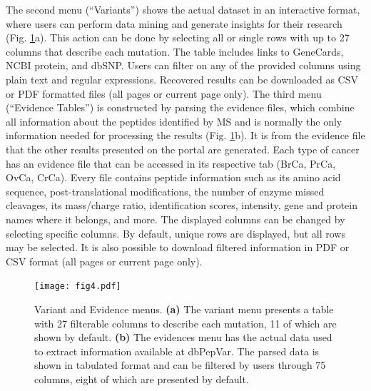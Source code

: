 \documentclass{ieeeaccess}
\begin{document}

The second menu (``Variants'') shows the actual dataset in an interactive format, where users can perform data mining and generate insights for their research (Fig. \ref{fig4}a). This action can be done by selecting all or single rows with up to 27 columns that describe each mutation. The table includes links to GeneCards, NCBI protein, and dbSNP. Users can filter on any of the provided columns using plain text and regular expressions. Recovered results can be downloaded as CSV or PDF formatted files (all pages or current page only). The third menu (``Evidence Tables'') is constructed by parsing the evidence files, which combine all information about the peptides identified by MS and is normally the only information needed for processing the results (Fig. \ref{fig4}b). It is from the evidence file that the other results presented on the portal are generated. Each type of cancer has an evidence file that can be accessed in its respective tab (BrCa, PrCa, OvCa, CrCa). Every file contains peptide information such as its amino acid sequence, post-translational modifications, the number of enzyme missed cleavages, its mass/charge ratio, identification scores, intensity, gene and  protein names where it belongs, and more. The displayed columns can be changed by selecting specific columns. By default, unique rows are displayed, but all rows may be selected. It is also possible to download filtered information in PDF or CSV format (all pages or current page only).


\begin{figure}[htpb]%
\centering
\texttt{[image: fig4.pdf]}
\caption{ 
Variant and Evidence menus. \textbf{(a)} The variant menu presents a table with 27 filterable columns to describe each mutation, 11 of which are shown by default. \textbf{(b)} The evidences menu has the actual data used to extract information available at dbPepVar. The parsed data is shown in tabulated  format and can be filtered by users through 75 columns, eight of which are presented by default.}\label{fig4}
\end{figure}

\end{document}
